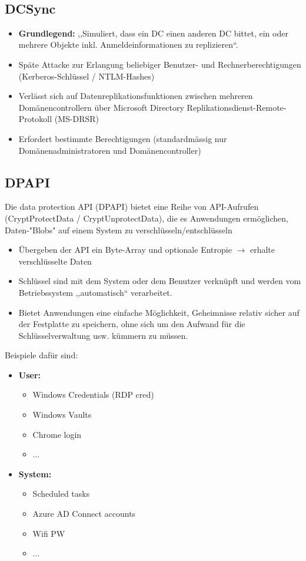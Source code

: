 \vfill
$ $
\columnbreak

\subsection{DCSync}
\begin{itemize}
    \item \textbf{Grundlegend:} ,,Simuliert, dass ein DC einen anderen DC bittet, ein oder mehrere Objekte inkl. Anmeldeinformationen zu replizieren``.
    \item Späte Attacke zur Erlangung beliebiger Benutzer- und Rechnerberechtigungen (Kerberos-Schlüssel / NTLM-Hashes)
    \item Verlässt sich auf Datenreplikationsfunktionen zwischen mehreren Domänencontrollern über Microsoft Directory Replikationsdienst-Remote-Protokoll (MS-DRSR)
    \item Erfordert bestimmte Berechtigungen (standardmässig nur Domänenadministratoren und Domänencontroller)
\end{itemize}

\subsection{DPAPI}

Die data protection API (DPAPI) bietet eine Reihe von API-Aufrufen (CryptProtectData / CryptUnprotectData), die es Anwendungen ermöglichen, Daten-"Blobs" auf einem System zu verschlüsseln/entschlüsseln
\begin{itemize}
    \item Übergeben der API ein Byte-Array und optionale Entropie $\rightarrow$  erhalte verschlüsselte Daten
    \item Schlüssel sind mit dem System oder dem Benutzer verknüpft und werden vom Betriebssystem ,,automatisch`` verarbeitet.
    \item Bietet Anwendungen eine einfache Möglichkeit, Geheimnisse relativ sicher auf der Festplatte zu speichern, ohne sich um den Aufwand für die Schlüsselverwaltung usw. kümmern zu müssen.
\end{itemize}

Beispiele dafür sind:
\begin{itemize}
    \item \textbf{User:}
    \begin{itemize}
        \item Windows Credentials (RDP cred)
        \item Windows Vaults
        \item Chrome login
        \item ...
    \end{itemize}
    \item \textbf{System:}
    \begin{itemize}
        \item Scheduled tasks
        \item Azure AD Connect accounts
        \item Wifi PW
        \item ...
    \end{itemize}
\end{itemize}

